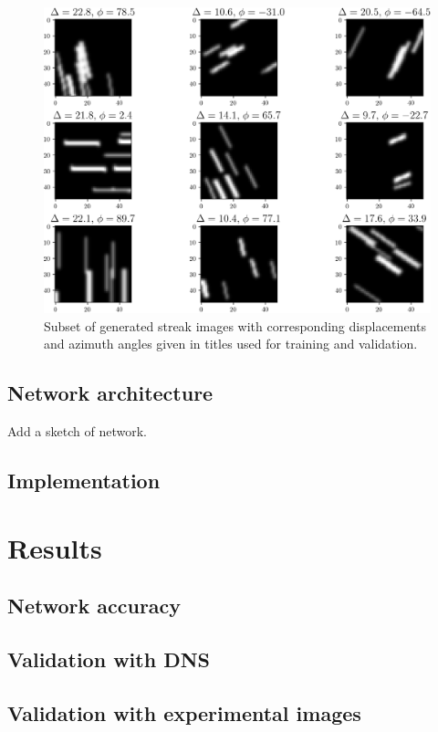 \documentclass{svjour3}                     %
\begin{document}
\begin{figure}
\includegraphics[width=\textwidth]{figs/figure1.png}
\caption{Subset of generated streak images with corresponding displacements and azimuth angles given in titles used for training and validation.}
\label{fig:fig1}
\end{figure}

\subsection{Network architecture}

Add a sketch of network. 

\subsection{Implementation}

\section{Results}

\subsection{Network accuracy}

\subsection{Validation with DNS}

\subsection{Validation with experimental images}
\end{document}
